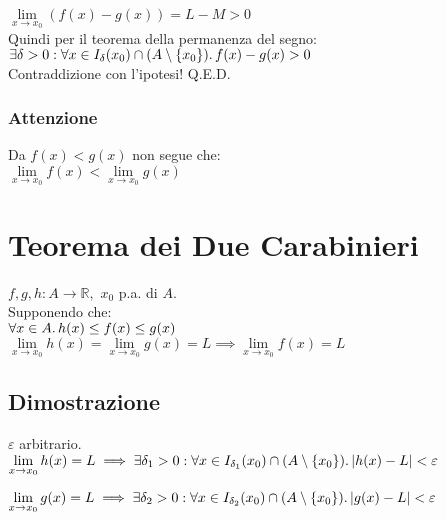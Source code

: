 \documentclass[a4paper, twoside, italian, 11pt]{book}
\newcommand{\braces}[1] {\left \{ #1 \right \}}
\newcommand{\abs}[1] {\left | #1 \right |}
\newcommand{\R}{\mathbb{R}}
\begin{document}
$\lim\limits_{x \to x_0} (f(x) - g(x)) = L - M > 0$ \\

\noindent
Quindi per il teorema della permanenza del segno: \\

$\exists \delta > 0 : \forall x \in I_\delta(x_0) \cap (A \setminus \braces{x_0}) \ldotp f(x) - g(x) > 0$ \\

\noindent
Contraddizione con l'ipotesi! Q.E.D.


\subsubsection{Attenzione}

\noindent
Da $f(x) < g(x)$ non segue che: \\

$\lim\limits_{x \to x_0} f(x) < \lim\limits_{x \to x_0} g(x)$



\section{Teorema dei Due Carabinieri}

\noindent
$f, g, h : A \rightarrow \R,$ $x_0$ p.a. di $A$. \\

\noindent
Supponendo che: \\

$\forall x \in A \ldotp h(x) \leq f(x) \leq g(x)$ \\

\noindent
$\lim\limits_{x \to x_0} h(x) = \lim\limits_{x \to x_0} g(x) = L \implies \lim\limits_{x \to x_0} f(x) = L$


\subsection{Dimostrazione}

\noindent
$\varepsilon$ arbitrario. \\

$\lim\limits_{x \to x_0} h(x) = L \implies \exists \delta_1 > 0 : \forall x \in I_{\delta_1}(x_0) \cap (A \setminus \braces{x_0}) \ldotp \abs{h(x) - L} < \varepsilon$

$\lim\limits_{x \to x_0} g(x) = L \implies \exists \delta_2 > 0 : \forall x \in I_{\delta_2}(x_0) \cap (A \setminus \braces{x_0}) \ldotp \abs{g(x) - L} < \varepsilon$ \\
\end{document}
